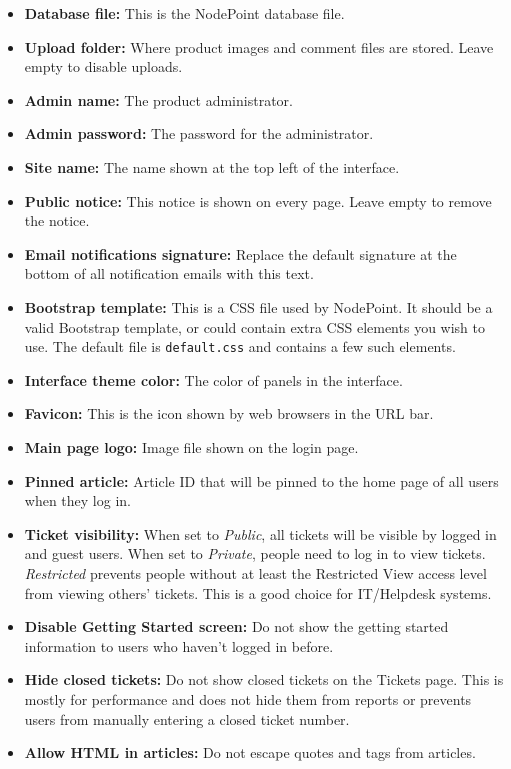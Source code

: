 \documentclass[11pt]{article}
\begin{document}
\begin{itemize}
\item \textbf{Database file:} This is the NodePoint database file.
\item \textbf{Upload folder:} Where product images and comment files are stored. Leave empty to disable uploads.
\item \textbf{Admin name:} The product administrator.
\item \textbf{Admin password:} The password for the administrator.
\item \textbf{Site name:} The name shown at the top left of the interface.
\item \textbf{Public notice:} This notice is shown on every page. Leave empty to remove the notice.
\item \textbf{Email notifications signature:} Replace the default signature at the bottom of all notification emails with this text.
\item \textbf{Bootstrap template:} This is a CSS file used by NodePoint. It should be a valid Bootstrap template, or could contain extra CSS elements you wish to use. The default file is \texttt{default.css} and contains a few such elements.
\item \textbf{Interface theme color:} The color of panels in the interface.
\item \textbf{Favicon:} This is the icon shown by web browsers in the URL bar.
\item \textbf{Main page logo:} Image file shown on the login page.
\item \textbf{Pinned article:} Article ID that will be pinned to the home page of all users when they log in.
\item \textbf{Ticket visibility:} When set to \textit{Public}, all tickets will be visible by logged in and guest users. When set to \textit{Private}, people need to log in to view tickets. \textit{Restricted} prevents people without at least the Restricted View access level from viewing others' tickets. This is a good choice for IT/Helpdesk systems.
\item \textbf{Disable Getting Started screen:} Do not show the getting started information to users who haven't logged in before.
\item \textbf{Hide closed tickets:} Do not show closed tickets on the Tickets page. This is mostly for performance and does not hide them from reports or prevents users from manually entering a closed ticket number.
\item \textbf{Allow HTML in articles:} Do not escape quotes and tags from articles.

\end{itemize}
\end{document}
